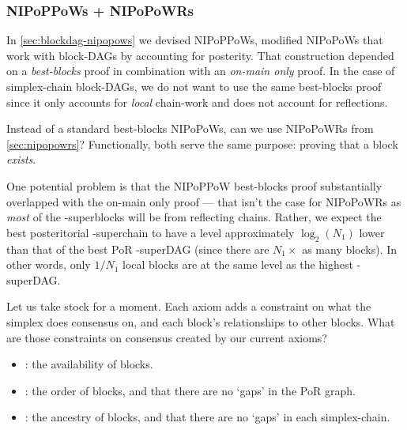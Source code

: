 














\subsubsection{NIPoPPoWs + NIPoPoWRs} %
\label{sec:blockdag-nipopowrs}


In \autoref{sec:blockdag-nipopows} we devised NIPoPPoWs, modified NIPoPoWs that work with block-DAGs by accounting for posterity.
That construction depended on a \emph{best-blocks} proof in combination with an \emph{on-main only} proof.
In the case of simplex-chain block-DAGs, we do not want to use the same best-blocks proof since it only accounts for \emph{local} chain-work and does not account for reflections.

Instead of a standard best-blocks NIPoPoWs, can we use NIPoPoWRs from \autoref{sec:nipopowrs}?
Functionally, both serve the same purpose: proving that a block \emph{exists}.

One potential problem is that the NIPoPPoW best-blocks proof substantially overlapped with the on-main only proof --- that isn't the case for NIPoPoWRs as \emph{most} of the \mu-superblocks will be from reflecting chains.
Rather, we expect the best posteritorial \mu-superchain to have a \mu level approximately $\log_2({N_1})$ lower than that of the best PoR \mu-superDAG (since there are $N_1\times$ as many blocks).
In other words, only $1/N_1$ local blocks are at the same \mu level as the highest \mu-superDAG.

Let us take stock for a moment.
Each axiom adds a constraint on what the simplex does consensus on, and each block's relationships to other blocks.
What are those constraints on consensus created by our current axioms?
\begin{itemize}
    \item \AxOfAvailability: the availability of blocks.
    \item \AxOfMaximalReflection: the order of blocks, and that there are no `gaps' in the PoR graph.
    \item \AxOfUnifiedAncestry: the ancestry of blocks, and that there are no `gaps' in each simplex-chain.
\end{itemize}

